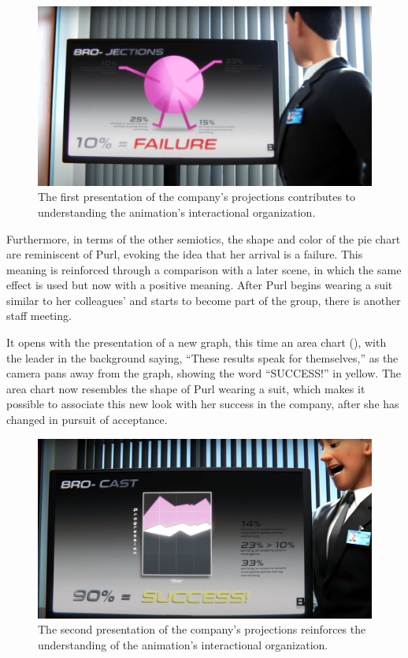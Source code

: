 \documentclass[english]{textolivre}
\begin{document}
\begin{figure}[htbp]
\centering
\begin{minipage}{.7\textwidth}
 \includegraphics[width=\textwidth]{Fig2.png}
 \caption{The first presentation of the company’s projections contributes to understanding the animation’s interactional organization.}
 \label{fig2}
\end{minipage}
\end{figure}

Furthermore, in terms of the other semiotics, the shape and color of the pie chart are reminiscent of Purl, evoking the idea that her arrival is a failure. This meaning is reinforced through a comparison with a later scene, in which the same effect is used but now with a positive meaning. After Purl begins wearing a suit similar to her colleagues’ and starts to become part of the group, there is another staff meeting. 

It opens with the presentation of a new graph, this time an area chart (), with the leader in the background saying, “These results speak for themselves,” as the camera pans away from the graph, showing the word “SUCCESS!” in yellow. The area chart now resembles the shape of Purl wearing a suit, which makes it possible to associate this new look with her success in the company, after she has changed in pursuit of acceptance.

\begin{figure}[htbp]
\centering
\begin{minipage}{.7\textwidth}
 \includegraphics[width=\textwidth]{Fig3.png}
 \caption{The second presentation of the company’s projections reinforces the understanding of the animation’s interactional organization.}
 \label{fig3}
\end{minipage}
\end{figure}
\end{document}
